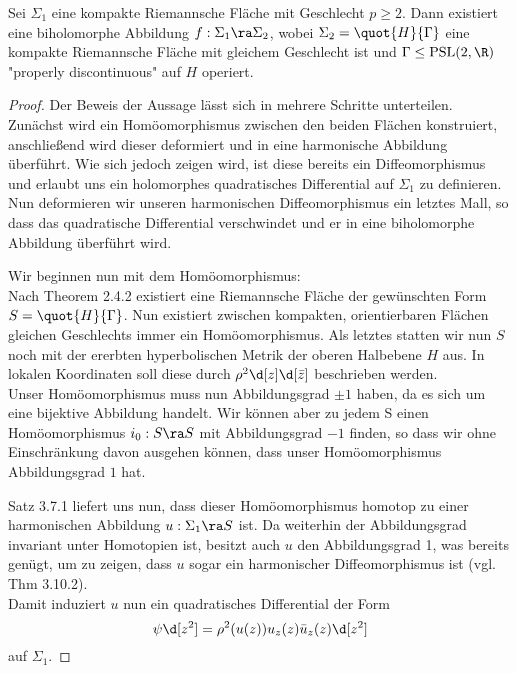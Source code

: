 
\begin{thm}
  Sei $\Sigma_1$ eine kompakte Riemannsche Fläche mit Geschlecht $p \geq 2$. Dann existiert eine biholomorphe Abbildung $f: \Sigma_1 \ra \Sigma_2$, wobei $\Sigma_2 = \quot{H}{\Gamma}$ eine kompakte Riemannsche Fläche mit gleichem Geschlecht ist und $\Gamma \leq \operatorname{PSL}(2,\R)$ "properly discontinuous" auf $H$ operiert.
\end{thm}

\begin{proof}
  Der Beweis der Aussage lässt sich in mehrere Schritte unterteilen. Zunächst wird ein Homöomorphismus zwischen den beiden Flächen konstruiert, anschließend wird dieser deformiert und in eine harmonische Abbildung überführt. Wie sich jedoch zeigen wird, ist diese bereits ein Diffeomorphismus und erlaubt uns ein holomorphes quadratisches Differential auf $\Sigma_1$ zu definieren. Nun deformieren wir unseren harmonischen Diffeomorphismus ein letztes Mall, so dass das quadratische Differential verschwindet und er in eine biholomorphe Abbildung überführt wird.

  Wir beginnen nun mit dem Homöomorphismus: \\
  Nach Theorem 2.4.2 existiert eine Riemannsche Fläche der gewünschten Form $S = \quot{H}{\Gamma}$. %
  Nun existiert zwischen kompakten, orientierbaren Flächen gleichen Geschlechts immer ein Homöomorphismus. %
  Als letztes statten wir nun $S$ noch mit der ererbten hyperbolischen Metrik der oberen Halbebene $H$ aus. In lokalen Koordinaten soll diese durch $\rho^2 \d[z] \d[\bar z]$ beschrieben werden. \\
  Unser Homöomorphismus muss nun Abbildungsgrad $\pm 1$ haben, da es sich um eine bijektive Abbildung handelt. Wir können aber zu jedem S einen Homöomorphismus $i_0 : S \ra S$ mit Abbildungsgrad $-1$ finden, so dass wir ohne Einschränkung davon ausgehen können, dass unser Homöomorphismus Abbildungsgrad $1$ hat. 

  Satz 3.7.1 liefert uns nun, dass dieser Homöomorphismus homotop zu einer harmonischen Abbildung $u: \Sigma_1 \ra S$ ist. Da weiterhin der Abbildungsgrad invariant unter Homotopien ist, besitzt auch $u$ den Abbildungsgrad 1, was bereits genügt, um zu zeigen, dass $u$ sogar ein harmonischer Diffeomorphismus ist (vgl. Thm 3.10.2). \\
  Damit induziert $u$ nun ein quadratisches Differential der Form
  \[
  \psi \d[z^2] = \rho^2(u(z)) u_z(z) \bar u_z(z) \d[z^2]
  \]
  auf $\Sigma_1$.


\end{proof}
